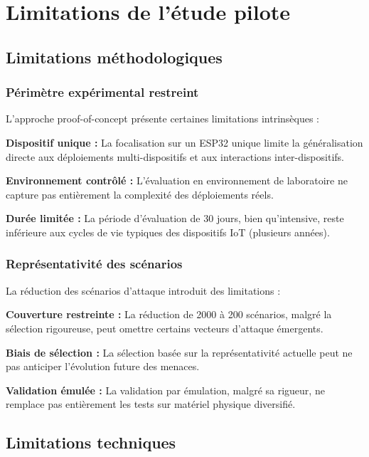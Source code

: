 \section{Limitations de l'étude pilote}

\subsection{Limitations méthodologiques}

\subsubsection{Périmètre expérimental restreint}

L'approche proof-of-concept présente certaines limitations intrinsèques :

\textbf{Dispositif unique :} La focalisation sur un ESP32 unique limite la généralisation directe aux déploiements multi-dispositifs et aux interactions inter-dispositifs.

\textbf{Environnement contrôlé :} L'évaluation en environnement de laboratoire ne capture pas entièrement la complexité des déploiements réels.

\textbf{Durée limitée :} La période d'évaluation de 30 jours, bien qu'intensive, reste inférieure aux cycles de vie typiques des dispositifs IoT (plusieurs années).

\subsubsection{Représentativité des scénarios}

La réduction des scénarios d'attaque introduit des limitations :

\textbf{Couverture restreinte :} La réduction de 2000 à 200 scénarios, malgré la sélection rigoureuse, peut omettre certains vecteurs d'attaque émergents.

\textbf{Biais de sélection :} La sélection basée sur la représentativité actuelle peut ne pas anticiper l'évolution future des menaces.

\textbf{Validation émulée :} La validation par émulation, malgré sa rigueur, ne remplace pas entièrement les tests sur matériel physique diversifié.

\subsection{Limitations techniques}

